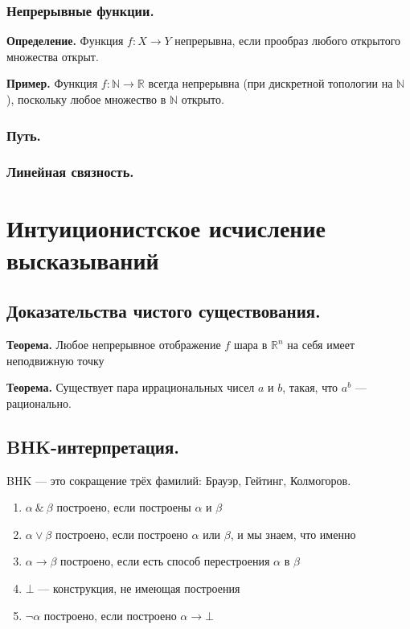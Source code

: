 \documentclass[10pt,a4paper,oneside]{article}
\begin{document}
\subsubsection{Непрерывные функции.}

\noindent \textbf{ Определение. } 
Функция $f: X \rightarrow Y$ непрерывна, если прообраз любого открытого множества открыт.

\noindent \textbf{ Пример. } 
Функция $f: \mathbb{N} \rightarrow \mathbb{R}$ всегда непрерывна (при дискретной топологии на $\mathbb{N}$), 
поскольку любое множество в $\mathbb{N}$ открыто.

\subsubsection{Путь.}

\subsubsection{Линейная связность.}


\section{Интуиционистское исчисление высказываний}
\subsection{Доказательства чистого существования.}

\noindent \textbf{ Теорема. }
Любое непрерывное отображение $f$ шара в $\mathbb{R}^n$ на себя имеет неподвижную точку

\noindent \textbf{ Теорема. }
Существует пара иррациональных чисел $a$ и $b$,
такая, что $a^b$ — рационально.

\subsection{BHK-интерпретация.}
BHK — это сокращение трёх фамилий: Брауэр, Гейтинг, Колмогоров.

\begin{enumerate}

\item $\alpha\ \&\ \beta$ построено, если построены $\alpha$ и $\beta$
\item $\alpha \vee \beta$ построено, если построено $\alpha$ или $\beta$,
и мы знаем, что именно
\item $\alpha\rightarrow\beta$ построено, если есть способ перестроения
$\alpha$ в $\beta$
\item $\bot$ — конструкция, не имеющая построения
\item $\neg\alpha$ построено, если построено $\alpha\rightarrow\bot$

\end{enumerate}
\end{document}
